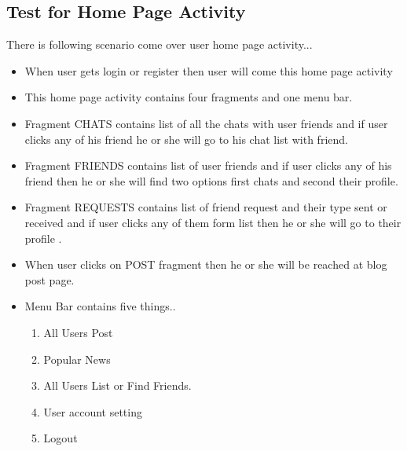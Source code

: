 \subsection{Test for Home Page Activity}
There is following scenario come over user home page activity...
\begin{itemize}
	\item When user gets login or register then user will come this home page activity
	\item This home page activity contains four fragments and one menu bar.
	\item Fragment CHATS contains list of all the chats with user friends and if user clicks any of his friend he or she will go to his chat list with friend. 
	\item Fragment FRIENDS contains list of user friends and if user clicks any of his friend then he or she will find two options first chats and second their profile.
	\item Fragment REQUESTS contains list of friend request and their type sent or received and if user clicks any of them form list then he or she will go to their profile .
	\item When user clicks on POST fragment then he or she will be reached at blog post page.
	\item Menu Bar contains five things..
	\begin{enumerate}
		\setlength{\itemsep}{-0.3em}
		\item All Users Post
		\item Popular News
		\item All Users List or Find Friends.
		\item User account setting
		\item Logout
	\end{enumerate}
	    
\end{itemize}
\noindent
